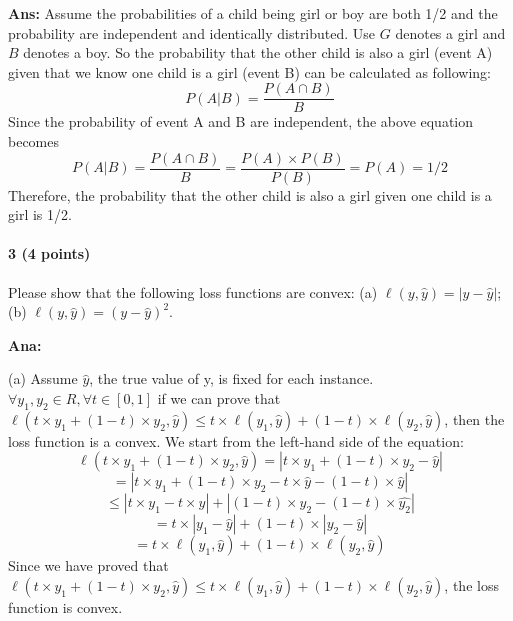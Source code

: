 \documentclass[11pt]{article}
\begin{document}
\noindent
\textbf{Ans:}
Assume the probabilities of a child being girl or boy are both 1/2 and the probability are independent and identically distributed. Use $G$ denotes a girl and $B$ denotes a boy. So the probability that the other child is also a girl (event A) given that we know one child is a girl (event B) can be calculated as following:
$$P(A | B) = \frac{P(A \cap B)}{B}$$
Since the probability of event A and B are independent, the above equation becomes 
$$P(A | B) = \frac{P(A \cap B)}{B} = \frac{P(A) \times P(B)}{P(B)} = P(A) = 1/2$$
Therefore, the probability that the other child is also a girl given one child is a girl is 1/2.



\paragraph{3 (4 points)} Please show that the following loss functions are convex: (a) $\ell (y, \hat{y}) = |y-\hat{y}|$; (b) $\ell (y, \hat{y}) = (y-\hat{y})^2$.

\noindent
\textbf{Ana:}

\noindent
(a) Assume $\hat{y}$, the true value of y, is fixed for each instance. $\forall y_1, y_2 \in R, \forall t \in [0,1]$ if we can prove that $\ell (t \times y_1 + (1-t) \times y_2, \hat{y}) \leq t \times \ell (y_1, \hat{y}) + (1-t) \times \ell (y_2, \hat{y})$,  then the loss function is a convex. We start from the left-hand side of the equation:
$$\ell (t \times y_1 + (1-t) \times y_2, \hat{y}) = | t \times y_1 + (1-t) \times y_2 - \hat{y} |$$
$$= | t \times y_1 + (1-t) \times y_2 - t \times \hat{y} - (1-t) \times \hat{y} |$$
$$\leq |t \times y_1 - t \times \hat{y}| + |(1-t) \times y_2 - (1-t) \times \hat{y_2}|$$
$$= t \times |y_1 - \hat{y}| + (1-t) \times |y_2 - \hat{y}|$$
$$= t \times \ell(y_1, \hat{y}) + (1-t) \times \ell(y_2, \hat{y})$$
Since we have proved that $\ell (t \times y_1 + (1-t) \times y_2, \hat{y}) \leq t \times \ell (y_1, \hat{y}) + (1-t) \times \ell (y_2, \hat{y})$, the loss function is convex.\\
\end{document}
